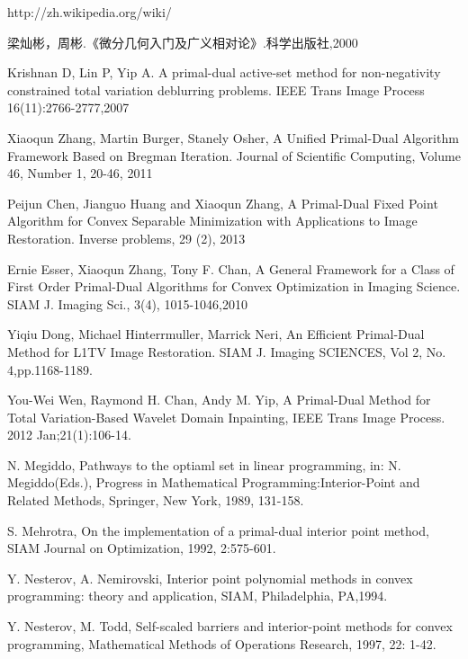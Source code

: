 \documentclass[a4paper,12pt]{article}
\begin{document}
\begin{thebibliography}{00}
http://zh.wikipedia.org/wiki/%

梁灿彬，周彬.《微分几何入门及广义相对论》.科学出版社,2000

Krishnan D, Lin P, Yip A. A primal-dual active-set method for non-negativity constrained total variation deblurring problems. IEEE Trans
Image Process 16(11):2766-2777,2007

Xiaoqun Zhang, Martin Burger, Stanely Osher, A Unified Primal-Dual Algorithm Framework Based on Bregman Iteration. Journal of Scientific Computing, Volume 46, Number 1, 20-46, 2011

Peijun Chen, Jianguo Huang and Xiaoqun Zhang, A Primal-Dual Fixed Point Algorithm for Convex Separable Minimization with Applications to Image Restoration. Inverse problems, 29 (2), 2013

Ernie Esser, Xiaoqun Zhang, Tony F. Chan, A General Framework for a Class of First Order Primal-Dual Algorithms for Convex Optimization in Imaging Science. SIAM J. Imaging Sci., 3(4), 1015-1046,2010 

Yiqiu Dong, Michael Hinterrmuller, Marrick Neri, An Efficient Primal-Dual Method for L1TV Image Restoration. SIAM J. Imaging SCIENCES, Vol 2, No. 4,pp.1168-1189.

You-Wei Wen, Raymond H. Chan, Andy M. Yip, A Primal-Dual Method for Total Variation-Based Wavelet Domain Inpainting, IEEE Trans Image Process. 2012 Jan;21(1):106-14.

N. Megiddo, Pathways to the optiaml set in linear programming, in: N. Megiddo(Eds.), Progress in Mathematical Programming:Interior-Point and Related Methods, Springer, New York, 1989, 131-158.

S. Mehrotra, On the implementation of a primal-dual interior point method, SIAM Journal on Optimization, 1992, 2:575-601.

Y. Nesterov, A. Nemirovski, Interior point polynomial methods in convex programming: theory and application, SIAM, Philadelphia, PA,1994.

Y. Nesterov, M. Todd, Self-scaled barriers and interior-point methods for convex programming, Mathematical Methods of Operations Research, 1997, 22: 1-42.

\end{thebibliography}
\end{document}

